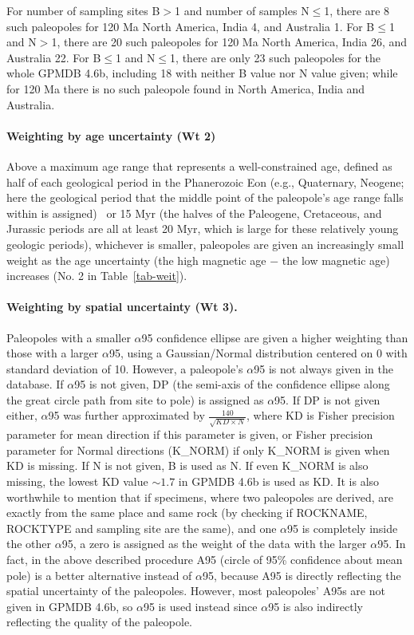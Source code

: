 For number of sampling sites B$>$1 and number of samples N$\leq$1, there are 8
such paleopoles for 120 Ma North America, India 4, and Australia 1.
For B$\leq$1 and N$>$1, there are 20 such paleopoles for 120 Ma
North America, India 26, and Australia 22. For B$\leq$1 and N$\leq$1, there are
only 23 such paleopoles for the whole GPMDB 4.6b, including 18 with neither B
value nor N value given; while for 120 Ma there is no such paleopole
found in North America, India and Australia.

\paragraph{Weighting by age uncertainty (Wt 2)} Above a maximum age range
that represents a well-constrained age, defined as half of each geological
period in the Phanerozoic Eon (e.g., Quaternary, Neogene; here the geological
period that the middle point of the paleopole's age range falls within is
assigned)~\citep{v90,T20} or 15 Myr (the halves of the Paleogene, Cretaceous,
and Jurassic periods are all at least 20 Myr, which is large for these
relatively young geologic periods), whichever is smaller, paleopoles are given
an increasingly small weight as the age uncertainty (the high magnetic age $-$
the low magnetic age) increases (No. 2 in Table~\ref{tab-weit}).

\paragraph{Weighting by spatial uncertainty (Wt 3).} Paleopoles with a
smaller $\alpha$95 confidence ellipse are given a higher weighting than those
with a larger $\alpha$95, using a Gaussian/Normal distribution centered on 0
with standard deviation of 10. However, a paleopole's $\alpha$95 is not always
given in the database. If $\alpha$95 is not given, DP (the semi-axis of the
confidence ellipse along the great circle path from site to pole) is assigned as
$\alpha$95. If DP is not given either, $\alpha$95 was further approximated by
$\frac{140}{\sqrt{KD\times{}N}}$, where KD is Fisher precision parameter for
mean direction if this parameter is given, or Fisher precision parameter for
Normal directions (K\_NORM) if only K\_NORM is given when KD is missing. If N is
not given, B is used as N. If even K\_NORM is also missing, the lowest KD value
${\sim}1.7$ in GPMDB 4.6b is used as KD\@. It is also worthwhile to mention that
if specimens, where two paleopoles are derived, are exactly from the same place
and same rock (by checking if ROCKNAME, ROCKTYPE and sampling site are the
same), and one $\alpha$95 is completely inside the other $\alpha$95, a zero is
assigned as the weight of the data with the larger $\alpha$95. In fact, in the
above described procedure A95 (circle of 95\% confidence about mean pole) is a
better alternative instead of $\alpha$95, because A95 is directly reflecting the
spatial uncertainty of the paleopoles. However, most paleopoles' A95s are not
given in GPMDB 4.6b, so $\alpha$95 is used instead since $\alpha$95 is also
indirectly reflecting the quality of the paleopole.

